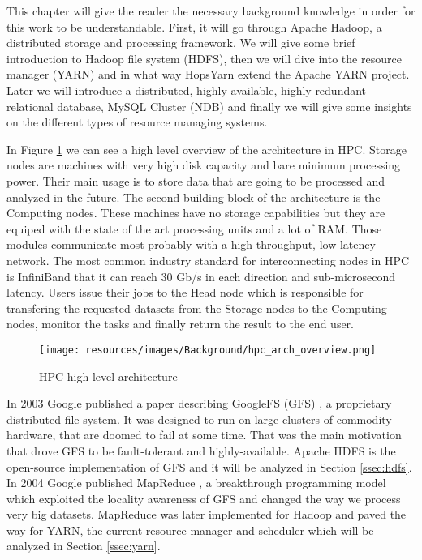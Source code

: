 This chapter will give the reader the necessary background knowledge
in order for this work to be understandable. First, it will go through
Apache Hadoop, a distributed storage and processing framework. We will
give some brief introduction to Hadoop file system (HDFS), then we
will dive into the
resource manager (YARN) and in what way HopsYarn extend the Apache
YARN project. Later we will introduce a distributed, highly-available,
highly-redundant relational database, MySQL Cluster (NDB) and finally
we will give some insights on the different types of resource managing
systems.

In Figure \ref{fig:back_hpc_arch_overview} we can see a high level
overview of the architecture in HPC. Storage nodes are machines with very high disk capacity and bare
minimum processing power. Their main usage is to store data that are
going to be processed and analyzed in the future. The second building
block of the architecture is the Computing nodes. These machines have
no storage capabilities but they are equiped with the state of the art
processing units and a lot of RAM. Those modules communicate most
probably with a high throughput, low latency network. The most common
industry standard for interconnecting nodes in HPC is InfiniBand
\cite{infiniband} that it can
reach 30 Gb/s in each direction and sub-microsecond latency. Users
issue their jobs to the Head node which is responsible for transfering
the requested datasets from the Storage nodes to the Computing nodes,
monitor the tasks and finally return the result to the end user.

\begin{figure}
\centering
\texttt{[image: resources/images/Background/hpc\_arch\_overview.png]}
\label{fig:back_hpc_arch_overview}
\caption{HPC high level architecture}
\end{figure}

In 2003 Google published a paper describing GoogleFS (GFS)
\cite{Ghemawat:2003:GFS:1165389.945450}, a proprietary distributed
file system. It was designed to run on large clusters of commodity
hardware, that are doomed to fail at some time. That was the main
motivation that drove GFS to be fault-tolerant and
highly-available. Apache HDFS is the open-source implementation of GFS
and it will be analyzed in Section \ref{ssec:hdfs}. In 2004 Google
published MapReduce \cite{Dean:2004:MSD:1251254.1251264}, a breakthrough programming model which exploited the locality
awareness of GFS and changed the way we process very big
datasets. MapReduce was later implemented for Hadoop and paved the way
for YARN, the current resource manager and scheduler 
which will be analyzed in Section \ref{ssec:yarn}.
